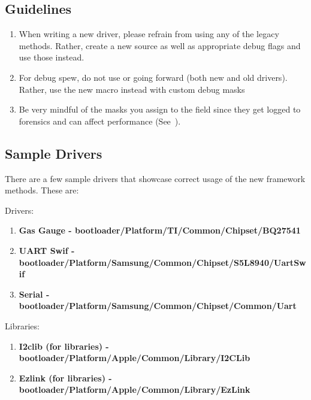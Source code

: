 \subsection{Guidelines}

\begin{enumerate}
\item When writing a new driver, please refrain from using any of the legacy methods. Rather, create a new source as well as appropriate debug flags 
and use those instead. 
\item For debug spew, do not use  or  going forward (both new and old drivers). Rather, use the new 
macro instead with custom debug masks
\item Be very mindful of the masks you assign to the  field since they get logged to forensics and can affect performance 
    (See~).
\end{enumerate}

\subsection{Sample Drivers}

There are a few sample drivers that showcase correct usage of the new framework methods. These are:

Drivers:
\begin{enumerate}
    \item \bfseries Gas Gauge - \mdseries bootloader/Platform/TI/Common/Chipset/BQ27541
    \item \bfseries UART Swif - \mdseries bootloader/Platform/Samsung/Common/Chipset/S5L8940/UartSwif 
    \item \bfseries Serial - \mdseries bootloader/Platform/Samsung/Common/Chipset/Common/Uart 
\end{enumerate}

\medskip

Libraries:
\begin{enumerate}
    \item \bfseries I2clib (for libraries) - \mdseries bootloader/Platform/Apple/Common/Library/I2CLib
    \item \bfseries Ezlink (for libraries) - \mdseries bootloader/Platform/Apple/Common/Library/EzLink
\end{enumerate}


